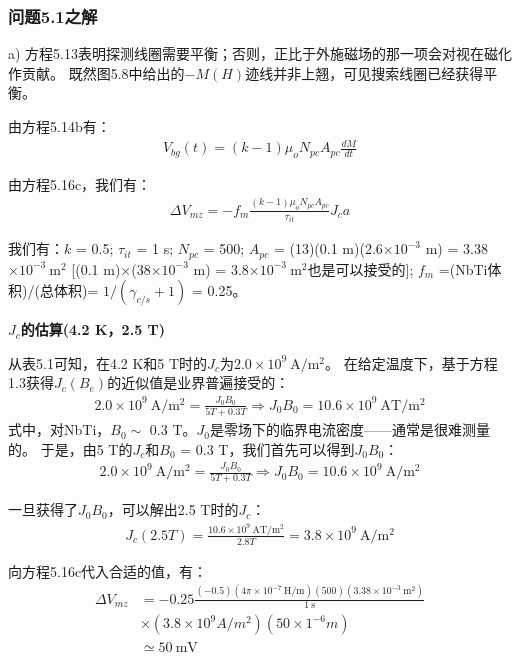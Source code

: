 \subsubsection{问题5.1之解}
a) 方程5.13表明探测线圈需要平衡；否则，正比于外施磁场的那一项会对视在磁化作贡献。
既然图5.8中给出的$−M(H)$迹线并非上翘，可见搜索线圈已经获得平衡。

由方程5.14b有：
\begin{align*}%
V_{bg}(t)=(k-1)\mu_{o}N_{pc}A_{pc}\frac{dM}{dt}\tag{5.14b}
\end{align*}

由方程5.16c，我们有：
\begin{align*}%
\Delta V_{mz}=-f_{m}\frac{(k-1)\mu_{o}N_{pc}A_{pc}}{\tau_{it}}J_{c}a\tag{5.16c}
\end{align*}

我们有：$k$ = 0.5; $\tau_{it}$ = 1 s; $N_{pc}$ = 500; $A_{pc}$ = (13)(0.1 m)(2.6$\times 10^{−3}$ m) = 3.38$\times 10^{−3}\ \mathrm{m^2}$ 
[(0.1 m)$\times$(38$\times 10^{−3}$ m) = 3.8$\times 10^{−3}\ \mathrm{m^2}$也是可以接受的]; $f_m$ =(NbTi体积)/(总体积)= $1/(\gamma_{c/s} + 1)$ = 0.25。

\textbf{$J_c$的估算(4.2 K，2.5 T)}

从表5.1可知，在4.2 K和5 T时的$J_c$为$2.0\times 10^9\ \mathrm{A/m^2}$。
在给定温度下，基于方程1.3获得$J_c(B_e)$的近似值是业界普遍接受的：
\begin{align*}%
2.0\times10^{9}\ \mathrm{A/m^{2}}=\frac{J_{0}B_{0}}{5T+0.3T}\Rightarrow J_{0}B_{0}=10.6\times 10^{9}\ \mathrm{AT/m^{2}} \tag{S1.1}
\end{align*}
式中，对NbTi，$B_0\sim$ 0.3 T。$J_0$是零场下的临界电流密度——通常是很难测量的。
于是，由5 T的$J_c$和$B_0$ = 0.3 T，我们首先可以得到$J_0 B_0$：
\begin{align*}%
2.0\times 10^{9}\ \mathrm{A/m^{2}}=\frac{J_{0}B_{0}}{5T+0.3T}\Rightarrow J_{0}B_{0}=10.6\times 10^{9}\ \mathrm{A/m^{2}}
\end{align*}

一旦获得了$J_0 B_0$，可以解出2.5 T时的$J_c$：
\begin{align*}%
J_{c}(2.5T)=\frac{10.6\times10^{9}\ \mathrm{AT/m^{2}}}{2.8T}=3.8\times 10^{9}\ \mathrm{A/m^{2}}
\end{align*}

向方程5.16c代入合适的值，有：
\begin{align*}%
\Delta V_{mz}&=-0.25\frac{(-0.5)(4\pi\times 10^{-7}\ \mathrm{H/m})(500)(3.38\times 10^{-3}\ \mathrm{m^{2}})}{1\ \mathrm{s}}\\
&\times(3.8\times 10^{9} A/m^{2})(50\times 1^{-6} m)\\
&\simeq 50\ \mathrm{mV}
\end{align*}

